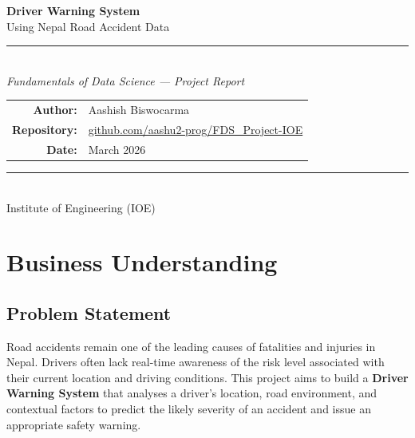 \documentclass[12pt,a4paper]{article}
\begin{document}
\begin{titlepage}
    \centering
    \vspace*{1.5cm}

    {\Huge\bfseries\color{primary} Driver Warning System}\\[0.4cm]
    {\Large\color{accent} Using Nepal Road Accident Data}\\[0.3cm]
    \rule{\linewidth}{1.5pt}\\[0.3cm]
    {\large\itshape Fundamentals of Data Science — Project Report}\\[2cm]

    \begin{tabular}{rl}
        \textbf{Author:}      & Aashish Biswocarma \\[0.3cm]
        \textbf{Repository:}  & \href{https://github.com/aashu2-prog/FDS_Project-IOE}{github.com/aashu2-prog/FDS\_Project-IOE} \\[0.3cm]
        \textbf{Date:}        & March 2026 \\[0.3cm]
    \end{tabular}

    \vfill
    \rule{\linewidth}{0.5pt}\\[0.2cm]
    {\small Institute of Engineering (IOE)}
\end{titlepage}

\tableofcontents
\newpage

\section{Business Understanding}

\subsection{Problem Statement}
Road accidents remain one of the leading causes of fatalities and injuries in Nepal. Drivers often lack real-time awareness of the risk level associated with their current location and driving conditions. This project aims to build a \textbf{Driver Warning System} that analyses a driver's location, road environment, and contextual factors to predict the likely severity of an accident and issue an appropriate safety warning.
\end{document}
